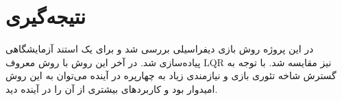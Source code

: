 \section{نتیجه‌گیری}
 در این پروژه روش بازی دیفراسیلی بررسی شد و برای یک استند آزمایشگاهی پیاده‌سازی شد. در آخر این روش با روش معروف LQR نیز مقایسه شد. با توجه به گسترش شاخه تئوری بازی و نیازمندی زیاد به چهارپره در آینده می‌توان به این روش امیدوار بود و کاربرد‌های بیشتری از آن را در آینده دید.